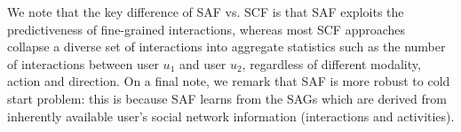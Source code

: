 




We note that the key difference of SAF vs. SCF is
that SAF exploits the predictiveness of fine-grained interactions, whereas most SCF
approaches~\cite{Noel2012NOF,lla,socinf,sr,rrmf,ste} collapse a diverse set
 of interactions into aggregate statistics such as the number of interactions 
between user $u_1$ and user $u_2$, regardless of different modality, action and direction.
On a final note, we remark that SAF is more robust to cold start 
problem: this is because SAF learns from the SAGs which are derived from 
inherently available user's social network information (interactions and activities).


